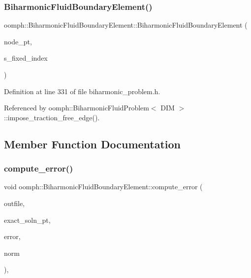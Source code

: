 \subsubsection{\texorpdfstring{Biharmonic\+Fluid\+Boundary\+Element()}{BiharmonicFluidBoundaryElement()}}
{\footnotesize\ttfamily oomph\+::\+Biharmonic\+Fluid\+Boundary\+Element\+::\+Biharmonic\+Fluid\+Boundary\+Element (\begin{DoxyParamCaption}\item[{\hyperlink{classoomph_1_1Node}{Node} $\ast$}]{node\+\_\+pt,  }\item[{const unsigned}]{s\+\_\+fixed\+\_\+index }\end{DoxyParamCaption})\hspace{0.3cm}{\ttfamily [inline]}}



Definition at line 331 of file biharmonic\+\_\+problem.\+h.



Referenced by oomph\+::\+Biharmonic\+Fluid\+Problem$<$ D\+I\+M $>$\+::impose\+\_\+traction\+\_\+free\+\_\+edge().



\subsection{Member Function Documentation}
\mbox{\label{classoomph_1_1BiharmonicFluidBoundaryElement_ac49d98d2b2633a3adf86489e246845a9}} 
\subsubsection{\texorpdfstring{compute\+\_\+error()}{compute\_error()}}
{\footnotesize\ttfamily void oomph\+::\+Biharmonic\+Fluid\+Boundary\+Element\+::compute\+\_\+error (\begin{DoxyParamCaption}\item[{std\+::ostream \&}]{outfile,  }\item[{\hyperlink{classoomph_1_1FiniteElement_a690fd33af26cc3e84f39bba6d5a85202}{Finite\+Element\+::\+Steady\+Exact\+Solution\+Fct\+Pt}}]{exact\+\_\+soln\+\_\+pt,  }\item[{double \&}]{error,  }\item[{double \&}]{norm }\end{DoxyParamCaption})\hspace{0.3cm}{\ttfamily [inline]}, {\ttfamily [virtual]}}



